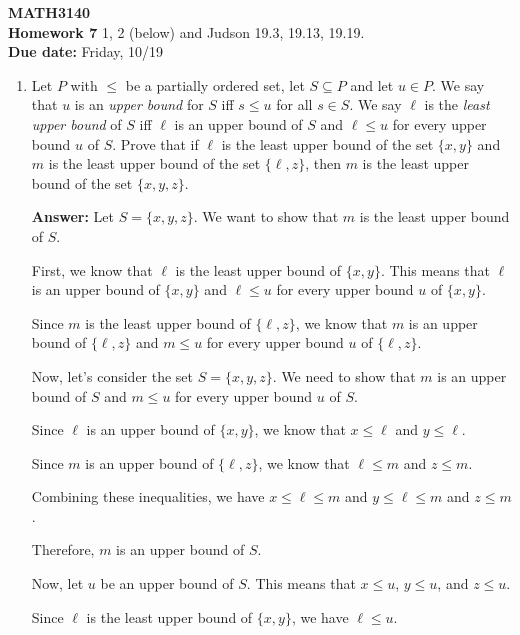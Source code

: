 \documentclass[12pt,reqno]{amsart}
\newcommand{\subject}{MATH}
\newcommand{\coursenumber}{3140}
\begin{document}
\thispagestyle{empty}

\noindent \textbf{\subject \coursenumber}\\
{\bf Homework 7} 
\vskip1cm
 1, 2 (below) and Judson 19.3, 19.13, 19.19.\\
{\bf Due date:} Friday, 10/19

\bigskip

\begin{enumerate}[{\bf 1.}]

\item %
Let $P$ with $\leq$ be a partially ordered set, let $S \subseteq P$ and let
$u\in P$.  We say that $u$ is an \emph{upper bound} for $S$ iff $s\leq u$ for
all $s \in S$.  We say $\ell$ is the \emph{least upper bound} of $S$ iff $\ell$
is an upper bound of $S$ and $\ell \leq u$ for every upper bound $u$ of $S$.
Prove that if $\ell$ is the least upper bound of the set $\{x, y\}$ and $m$ is
the least upper bound of the set $\{\ell, z\}$, then $m$ is the least upper
bound of the set $\{x, y, z\}$.

\textbf{Answer:} Let $S = \{x, y, z\}$. We want to show that $m$ is the least upper bound of $S$. 

First, we know that $\ell$ is the least upper bound of $\{x, y\}$. This means that $\ell$ is an upper bound of $\{x, y\}$ and $\ell \leq u$ for every upper bound $u$ of $\{x, y\}$. 

Since $m$ is the least upper bound of $\{\ell, z\}$, we know that $m$ is an upper bound of $\{\ell, z\}$ and $m \leq u$ for every upper bound $u$ of $\{\ell, z\}$. 

Now, let's consider the set $S = \{x, y, z\}$. We need to show that $m$ is an upper bound of $S$ and $m \leq u$ for every upper bound $u$ of $S$. 

Since $\ell$ is an upper bound of $\{x, y\}$, we know that $x \leq \ell$ and $y \leq \ell$. 

Since $m$ is an upper bound of $\{\ell, z\}$, we know that $\ell \leq m$ and $z \leq m$. 

Combining these inequalities, we have $x \leq \ell \leq m$ and $y \leq \ell \leq m$ and $z \leq m$. 

Therefore, $m$ is an upper bound of $S$. 

Now, let $u$ be an upper bound of $S$. This means that $x \leq u$, $y \leq u$, and $z \leq u$. 

Since $\ell$ is the least upper bound of $\{x, y\}$, we have $\ell \leq u$. 


\end{enumerate}
\end{document}
